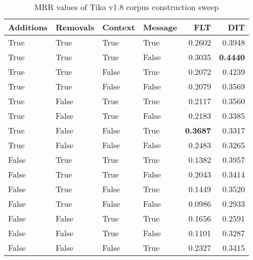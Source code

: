 
\begin{table}
\begin{spacing}{1.2}
\centering
\caption{MRR values of Tika v1.8 corpus construction sweep}
\label{table:tika_corpus_sweep}
\vspace{0.2em}
\begin{tabular}{llll|rr}
\toprule
Additions & Removals & Context & Message & FLT &       DIT \\
\midrule
     True &     True &    True &    True &           0.2602 &       0.3948 \\
     True &     True &    True &   False &           0.3035 & {\bf 0.4440} \\
     True &     True &   False &    True &           0.2072 &       0.4239 \\
     True &     True &   False &   False &           0.2079 &       0.3569 \\
     True &    False &    True &    True &           0.2117 &       0.3560 \\
     True &    False &    True &   False &           0.2183 &       0.3385 \\
     True &    False &   False &    True &     {\bf 0.3687} &       0.3317 \\
     True &    False &   False &   False &           0.2483 &       0.3265 \\
    False &     True &    True &    True &           0.1382 &       0.3957 \\
    False &     True &    True &   False &           0.2043 &       0.3414 \\
    False &     True &   False &    True &           0.1449 &       0.3520 \\
    False &     True &   False &   False &           0.0986 &       0.2933 \\
    False &    False &    True &    True &           0.1656 &       0.2591 \\
    False &    False &    True &   False &           0.1101 &       0.3287 \\
    False &    False &   False &    True &           0.2327 &       0.3415 \\
\bottomrule
\end{tabular}

\end{spacing}
\end{table}
